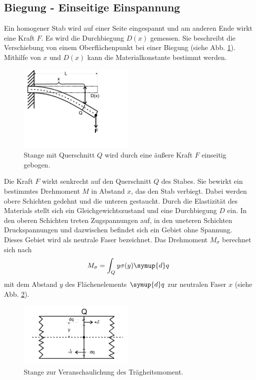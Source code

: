 \subsection{Biegung - Einseitige Einspannung}
Ein homogener Stab wird auf einer Seite eingespannt und am anderen Ende wirkt eine Kraft $F$.
Es wird die Durchbiegung $D(x)$ gemessen.
Sie beschreibt die Verschiebung von einem Oberflächenpunkt bei einer Biegung (siehe Abb. \ref{fig:stab_einseitig}).
Mithilfe von $x$ und $D(x)$ kann die Materialkonstante bestimmt werden.
\begin{figure}
    \centering
    \includegraphics[width=0.5\textwidth]{content/data/biegen_einseitig.jpg}
    \caption{Stange mit Querschnitt $Q$ wird durch eine äußere Kraft $F$ einseitig gebogen.\cite{anleitung}}
    \label{fig:stab_einseitig}
\end{figure}
Die Kraft $F$ wirkt senkrecht auf den Querschnitt $Q$ des Stabes.
Sie bewirkt ein bestimmtes Drehmoment $M$ in Abstand $x$, das den Stab verbiegt.
Dabei werden obere Schichten gedehnt und die unteren gestaucht.
Durch die Elastizität des Materials stellt sich ein Gleichgewichtszustand und eine Durchbiegung $D$ ein.
In den oberen Schichten treten Zugspannungen auf, in den uneteren Schichten Druckspannungen und dazwischen befindet sich ein Gebiet ohne Spannung.
Dieses Gebiet wird als neutrale Faser bezeichnet.
Das Drehmoment $M_\sigma$ berechnet sich nach
\begin{equation}
    M_\sigma = \int_Q y \sigma(y) \symup{d}q
\end{equation}
mit dem Abstand $y$ des Flächenelements $\symup{d}q$ zur neutralen Faser $x$ (siehe Abb. \ref{fig:drehmoment}).
\begin{figure}
    \centering
    \includegraphics[width=0.5\textwidth]{content/data/drehmoment.jpg}
    \caption{Stange zur Veranschaulichung des Trägheitsmoment.\cite{anleitung}}
    \label{fig:drehmoment}
\end{figure}
